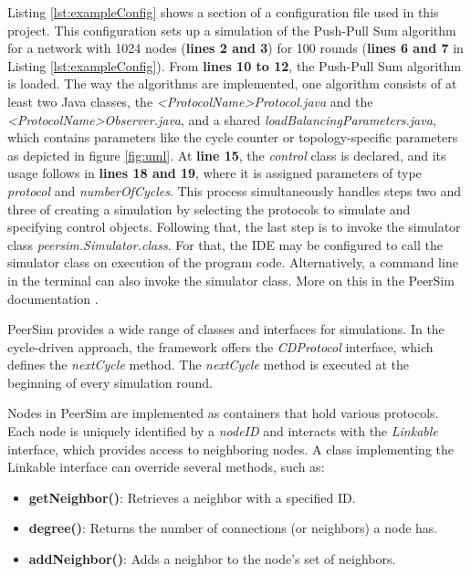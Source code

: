 Listing \ref{lst:exampleConfig} shows a section of a configuration file used in this project. This configuration sets up a simulation of the Push-Pull Sum algorithm for a network with 1024 nodes (\textbf{lines 2 and 3}) for 100 rounds (\textbf{lines 6 and 7} in Listing \ref{lst:exampleConfig}). From \textbf{lines 10 to 12}, the Push-Pull Sum algorithm is loaded. The way the algorithms are implemented, one algorithm consists of at least two Java classes, the \textit{<ProtocolName>Protocol.java} and the \textit{<ProtocolName>Observer.java}, and a shared \textit{loadBalancingParameters.java}, which contains parameters like the cycle counter or topology-specific parameters as depicted in figure \ref{fig:uml}. At \textbf{line 15}, the \textit{control} class is declared, and its usage follows in \textbf{lines 18 and 19}, where it is assigned parameters of type \textit{protocol} and \textit{numberOfCycles}. This process simultaneously handles steps two and three of creating a simulation by selecting the protocols to simulate and specifying control objects. Following that, the last step is to invoke the simulator class \textit{peersim.Simulator.class}. For that, the IDE may be configured to call the simulator class on execution of the program code. Alternatively, a command line in the terminal can also invoke the simulator class. More on this in the PeerSim documentation \cite{peersimdocs}.

PeerSim provides a wide range of classes and interfaces for simulations. In the cycle-driven approach, the framework offers the \textit{CDProtocol} interface, which defines the \textit{nextCycle} method. The \textit{nextCycle} method is executed at the beginning of every simulation round.

Nodes in PeerSim are implemented as containers that hold various protocols. Each node is uniquely identified by a \textit{nodeID} and interacts with the \textit{Linkable} interface, which provides access to neighboring nodes. A class implementing the Linkable interface can override several methods, such as:

\begin{itemize}
    \item \textbf{getNeighbor()}: Retrieves a neighbor with a specified ID.
    \item \textbf{degree()}: Returns the number of connections (or neighbors) a node has.
    \item \textbf{addNeighbor()}: Adds a neighbor to the node's set of neighbors.
\end{itemize}


